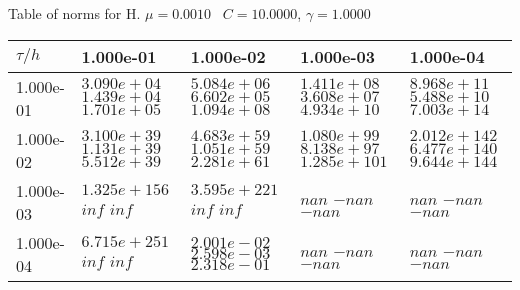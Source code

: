 \begin{center}
Table of norms for H. $\mu = 0.0010$ \, $C = 10.0000$, $\gamma = 1.0000$
  
\begin{tabular}{|p{1in}|p{1in}|p{1in}|p{1in}|p{1in}|} \hline
$\tau / h$ &1.000e-01 &1.000e-02 &1.000e-03 &1.000e-04 \\ \hline 
1.000e-01 & $3.090e+04$  $1.439e+04$  $1.701e+05$  & $5.084e+06$  $6.602e+05$  $1.094e+08$  & $1.411e+08$  $3.608e+07$  $4.934e+10$  & $8.968e+11$  $5.488e+10$  $7.003e+14$  \\ \hline 
1.000e-02 & $3.100e+39$  $1.131e+39$  $5.512e+39$  & $4.683e+59$  $1.051e+59$  $2.281e+61$  & $1.080e+99$  $8.138e+97$  $1.285e+101$  & $2.012e+142$  $6.477e+140$  $9.644e+144$  \\ \hline 
1.000e-03 & $1.325e+156$  $inf$  $inf$  & $3.595e+221$  $inf$  $inf$  & $nan$  $-nan$  $-nan$  & $nan$  $-nan$  $-nan$  \\ \hline 
1.000e-04 & $6.715e+251$  $inf$  $inf$  & $2.001e-02$  $2.598e-03$  $2.318e-01$  & $nan$  $-nan$  $-nan$  & $nan$  $-nan$  $-nan$  \\ \hline 

\end{tabular}\\[20pt]
\end{center}
